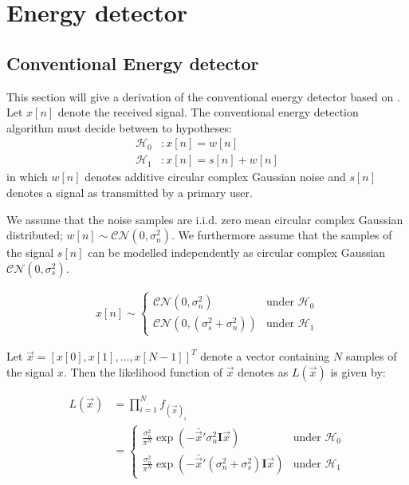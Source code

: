 \documentclass[a4paper, openany, oneside]{memoir}
\begin{document}
\section{Energy detector}

\subsection{Conventional Energy detector}\label{ssec:conv_ed_derivation}
This section will give a derivation of the conventional energy detector based on \cite{atapattu2014energy}.
Let $x[n]$ denote the received signal. The conventional energy detection algorithm must decide between to hypotheses:
\begin{align}\label{eq:hypotheses}
  \mathcal{H}_0&: x[n] = w[n]\\
  \mathcal{H}_1&: x[n] = s[n] + w[n]
\end{align}
in which $w[n]$ denotes additive circular complex Gaussian noise and $s[n]$ denotes a signal as transmitted by a primary user.

We assume that the noise samples are i.i.d. zero mean circular complex Gaussian distributed; $w[n] \sim \mathcal{CN}(0, \sigma_n^2)$. 
We furthermore assume that the samples of the signal $s[n]$ can be modelled independently as circular complex Gaussian $\mathcal{CN}(0, \sigma_s^2)$. %

\begin{align*}
x[n] \sim 
    \begin{cases}
        \mathcal{CN}(0, \sigma_n^2) & \text{under $\mathcal{H}_0$} \\
        \mathcal{CN}(0, (\sigma_s^2 + \sigma_n^2)) & \text{under $\mathcal{H}_1$}
    \end{cases}
\end{align*} 

Let $\vec{x} = \left[x[0], x[1], \ldots, x[N-1]\right]^T$ denote a vector containing $N$ samples of the signal $x$. Then the likelihood function of $\vec{x}$ denotes as $L(\vec{x})$ is given by:

\begin{align*}
    L(\vec{x}) &= \prod_{i=1}^N f_{(\vec{x})_i}\\
    &= \begin{cases}
        \frac{\sigma_n^2}{\pi^N } \exp(-\bar{\vec{x}}'\sigma_n^2\mathbf{I}\vec{x}) & \text{under $\mathcal{H}_0$} \\
        \frac{\sigma_n^2}{\pi^N } \exp(-\bar{\vec{x}}'(\sigma_n^2+\sigma_s^2)\mathbf{I}\vec{x}) & \text{under $\mathcal{H}_1$}
    \end{cases}
\end{align*}
\end{document}
